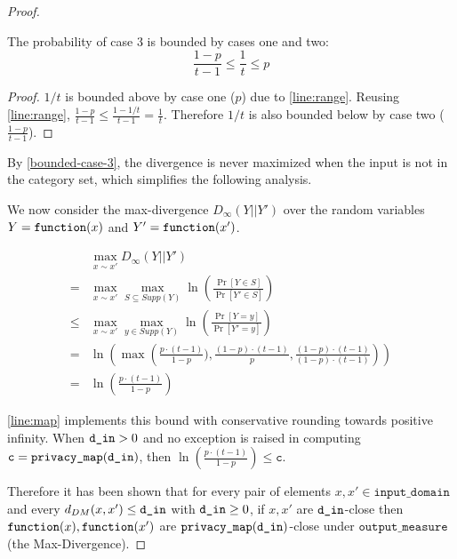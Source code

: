 \documentclass{article}
\begin{document}
\begin{proof}
\begin{tcolorbox}
\begin{lemma}
    \label{bounded-case-3}
    The probability of case 3 is bounded by cases one and two:
     \begin{equation}
        \frac{1 - p}{t - 1} \leq \frac{1}{t} \leq p
     \end{equation}
\end{lemma}

\begin{proof}
$1 / t$ is bounded above by case one ($p$) due to \ref{line:range}. 
Reusing \ref{line:range}, $\frac{1 - p}{t - 1} \leq \frac{1 - 1/t}{t - 1} = \frac{1}{t}$.
Therefore $1 / t$ is also bounded below by case two ($\frac{1 - p}{t - 1}$).
\end{proof}
\end{tcolorbox}

By \ref{bounded-case-3}, the divergence is never maximized when the input is not in the category set,
which simplifies the following analysis.

We now consider the max-divergence $D_{\infty}(Y||Y')$ over the random variables $Y = \texttt{function}(x)$ and $Y' = \texttt{function}(x')$.
    
\begin{align*}
    &\max_{x \sim x'} D_{\infty}(Y||Y') \\
    =& \max_{x \sim x'} \max_{S \subseteq Supp(Y)}\ln (\frac{\Pr[Y \in S]}{\Pr[Y' \in S]}) \\
    \le& \max_{x \sim x'} \max_{y \in Supp(Y)}\ln (\frac{\Pr[Y = y]}{\Pr[Y' = y]}) \\
    =& \ln \left(\max\left(\frac{p \cdot (t - 1)}{1 - p}), \frac{(1 - p) \cdot (t - 1)}{p}, \frac{(1 - p) \cdot (t - 1)}{(1 - p) \cdot (t - 1)}\right)\right) \\
    =& \ln (\frac{p \cdot (t - 1)}{1 - p})
\end{align*}

\ref{line:map} implements this bound with conservative rounding towards positive infinity. 
When $\texttt{d\_in} > 0$ and no exception is raised in computing $\texttt{c} = \texttt{privacy\_map}(\texttt{d\_in})$, then $\ln\left(\frac{p \cdot (t - 1)}{1 - p}\right) \leq \texttt{c}$. 

Therefore it has been shown that for every pair of elements $x, x' \in \texttt{input\_domain}$ and every $d_{DM}(x, x') \le \texttt{d\_in}$ with $\texttt{d\_in} \ge 0$, 
if $x, x'$ are $\texttt{d\_in}$-close then $\texttt{function}(x),\texttt{function}(x')$ are $\texttt{privacy\_map}(\texttt{d\_in})$-close under $\texttt{output\_measure}$ (the Max-Divergence).
\end{proof}
\end{document}
